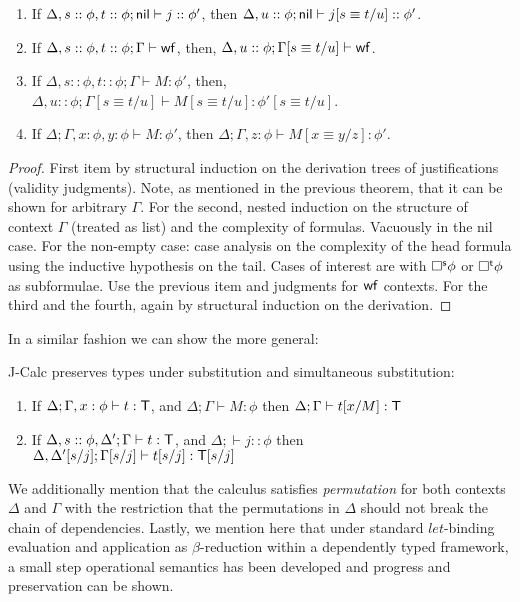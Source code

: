 {\begin{theorem}[Contraction]
\begin{enumerate}
\item If $\Delta, s::\phi, t::\phi; {\sf nil} \vdash j::\phi'$, then $\Delta, u::\phi; {\sf nil} \vdash j[s\equiv t/u]::\phi'$.
\item If $\Delta, s::\phi, t::\phi; \Gamma\vdash {\sf wf}$, then, $\Delta,u::\phi; \Gamma[s\equiv t/u]\vdash {\sf wf}$.
\item If $\Delta, s::\phi, t::\phi; \Gamma\vdash M:\phi'$, then, $\Delta,u::\phi; \Gamma[s\equiv t/u]\vdash M[s\equiv t/u]:\phi'[s\equiv t/u]$.
\item If $\Delta; \Gamma, x:\phi, y:\phi \vdash M:\phi'$, then $\Delta; \Gamma, z:\phi \vdash M[x\equiv y/z]:\phi'$.
\end{enumerate}
\end{theorem}
\begin{proof}
First item by structural induction on the derivation trees of justifications (validity judgments). Note, as mentioned in the previous theorem, that it can be shown for arbitrary $\Gamma$. For the second, nested induction on the structure of context $\Gamma$ (treated as list) and the complexity of formulas. Vacuously in the {\sf nil} case. For the non-empty case: case analysis on the complexity of the head formula using the inductive hypothesis on the tail. Cases of interest are with $\Box^{\sf s}\phi$ or $\Box^{\sf t}\phi$ as subformulae. Use the previous item and judgments for ${\sf wf }$ contexts. For the third and the fourth, again by structural induction on the derivation.
\end{proof}

In a similar fashion we can show the more general:

\begin{theorem}
{\sf J-Calc} preserves types under substitution and simultaneous substitution:
\begin{enumerate}
\item {If $\Delta;\Gamma,x:\phi\vdash t:{\sf T}$, and $\Delta;\Gamma\vdash M :\phi$ then $\Delta;\Gamma\vdash t[x/M]:{\sf T}$}
\item{
 If $\Delta, s::\phi,\Delta';\Gamma\vdash t:{\sf T}$, and $\Delta;\vdash j::\phi$ then $\Delta,\Delta'[s/j];\Gamma[s/j]\vdash t[s/j]:{\sf T}[s/j]$}
\end{enumerate}
\end{theorem}

We additionally mention that the calculus satisfies \textit{permutation} for both contexts $\Delta$ and $\Gamma$ with the restriction that the permutations in $\Delta$ should not break the chain of dependencies. Lastly, we mention here that under standard ${let}$-binding evaluation and application as $\beta$-reduction within a dependently typed framework, a small step operational semantics has been developed and progress and preservation can be shown.

}
